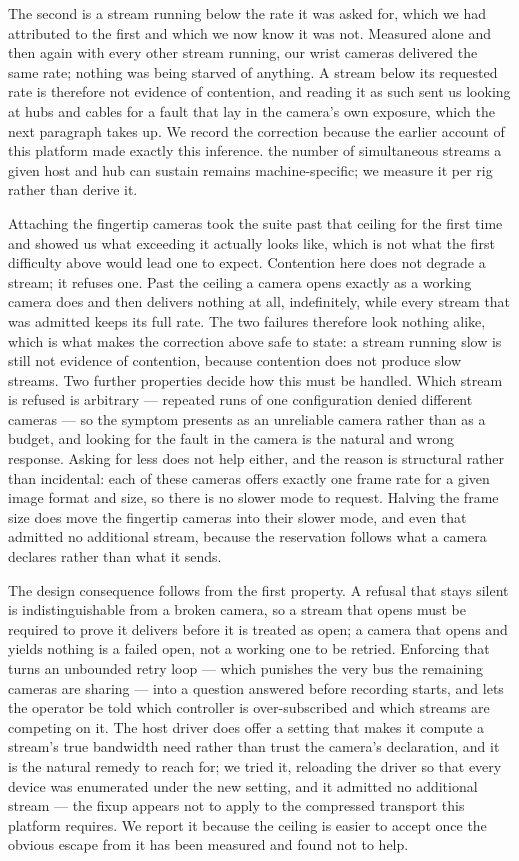 The second is a stream running below the rate it was asked for, which we had
attributed to the first and which we now know it was not. Measured alone and
then again with every other stream running, our wrist cameras delivered the same
rate; nothing was being starved of anything. A stream below its requested rate is
therefore not evidence of contention, and reading it as such sent us looking at
hubs and cables for a fault that lay in the camera's own exposure, which the next
paragraph takes up. We record the correction because the earlier account of this
platform made exactly this inference. \unjustified{} the number of simultaneous
streams a given host and hub can sustain remains machine-specific; we measure it
per rig rather than derive it.

Attaching the fingertip cameras took the suite past that ceiling for the first
time and showed us what exceeding it actually looks like, which is not what the
first difficulty above would lead one to expect. Contention here does not
degrade a stream; it refuses one. Past the ceiling a camera opens exactly as a
working camera does and then delivers nothing at all, indefinitely, while every
stream that was admitted keeps its full rate. The two failures therefore look
nothing alike, which is what makes the correction above safe to state: a stream
running slow is still not evidence of contention, because contention does not
produce slow streams. Two further properties decide how this must be handled.
Which stream is refused is arbitrary --- repeated runs of one configuration
denied different cameras --- so the symptom presents as an unreliable camera
rather than as a budget, and looking for the fault in the camera is the natural
and wrong response. Asking for less does not help either, and the reason is
structural rather than incidental: each of these cameras offers exactly one frame
rate for a given image format and size, so there is no slower mode to request.
Halving the frame size does move the fingertip cameras into their slower mode,
and even that admitted no additional stream, because the reservation follows what
a camera declares rather than what it sends.

The design consequence follows from the first property. A refusal that stays
silent is indistinguishable from a broken camera, so a stream that opens must be
required to prove it delivers before it is treated as open; a camera that opens
and yields nothing is a failed open, not a working one to be retried. Enforcing
that turns an unbounded retry loop --- which punishes the very bus the remaining
cameras are sharing --- into a question answered before recording starts, and
lets the operator be told which controller is over-subscribed and which streams
are competing on it. The host driver does offer a setting that makes it compute a
stream's true bandwidth need rather than trust the camera's declaration, and it
is the natural remedy to reach for; we tried it, reloading the driver so that
every device was enumerated under the new setting, and it admitted no additional
stream --- the fixup appears not to apply to the compressed transport this
platform requires. We report it because the ceiling is easier to accept once the
obvious escape from it has been measured and found not to help.

